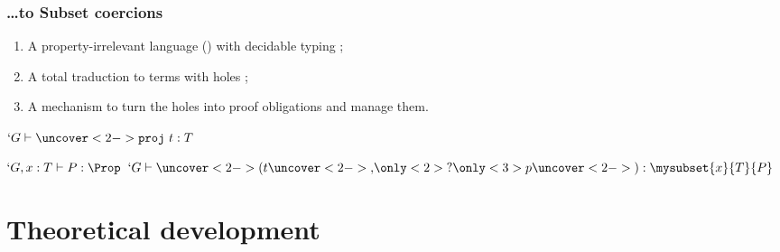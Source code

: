 \begin{frame}[t]
  \frametitle{\ldots to Subset coercions}
  
  \begin{enumerate}
  \item<1-> A property-irrelevant language (\lng{}) with \alert{decidable} typing ;
  \item<2-> A total traduction to \Coq{} terms with holes ;
  \item<3-> A mechanism to turn the holes into proof obligations and
    manage them.
  \end{enumerate}
  
  \begin{center}
    {$`G \typea \uncover<2->{\texttt{proj}~}t : T$}
    {}\DP

    \vspace{0.5cm}
    {$`G, x : T \type P : \Prop$}
    {}
    {$`G \type \uncover<2->{(}t\uncover<2->{, }\only<2>{?}\only<3>{p}\uncover<2->{)} : \mysubset{x}{T}{P}$}
    {}\DP
  \end{center}
  

\end{frame}

\section{Theoretical development}
\frame{\tableofcontents[currentsection]}

\subsection{\lng{}}

